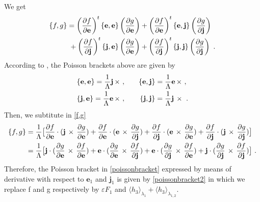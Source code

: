 \documentclass[a4paper]{article}
\begin{document}
We get
\begin{align}
\label{f,g}
\{f,g\}&=\left(\frac{\partial f}{\partial \mathbf e}\right)^{t} \{\mathbf e, \mathbf e\} \left(\frac{\partial g}{\partial \mathbf e}\right)
+\left(\frac{\partial f}{\partial \mathbf e}\right)^{t} \{\mathbf e, \mathbf j\} \left(\frac{\partial g}{\partial \mathbf j}\right)  \notag \\
& \; +\left(\frac{\partial f}{\partial \mathbf j}\right)^{t} \{\mathbf j, \mathbf e\} \left(\frac{\partial g}{\partial \mathbf e}\right)
+\left(\frac{\partial f}{\partial \mathbf j}\right)^{t} \{\mathbf j, \mathbf j\} \left(\frac{\partial g}{\partial \mathbf j}\right) \ .
\end{align}
According to \cite{Milankovitch}, the Poisson brackets above are given by 
\begin{align}
\label{milank}
\{\mathbf e, \mathbf e\}=\frac{1}{\Lambda}\mathbf j \, \times \ , \qquad & \{\mathbf e, \mathbf j\}=\frac{1}{\Lambda}\mathbf e \, \times \ , \notag \\
\{\mathbf j, \mathbf e\}=\frac{1}{\Lambda}\mathbf e \, \times \ , \qquad & \, \{\mathbf j, \mathbf j\}=\frac{1}{\Lambda}\mathbf j \, \times  \ .
\end{align}
Then, we subtitute in \eqref{f,g}
\begin{align}
\{f,g\}&=\frac{1}{\Lambda}\bigl[ \frac{\partial f}{\partial \mathbf e}  \cdot  (\mathbf j \, \times \, \frac{\partial g}{\partial \mathbf e})
+\frac{\partial f}{\partial \mathbf e}  \cdot  (\mathbf e \, \times \, \frac{\partial g}{\partial \mathbf j}) 
+\frac{\partial f}{\partial \mathbf j}  \cdot  (\mathbf e \, \times \, \frac{\partial g}{\partial \mathbf e})
+\frac{\partial f}{\partial \mathbf j}  \cdot  (\mathbf j \, \times \, \frac{\partial g}{\partial \mathbf j}) \bigl]  \notag \\
&=\frac{1}{\Lambda}\bigl[  \mathbf j \cdot (\frac{\partial g}{\partial \mathbf e} \, \times \, \frac{\partial f}{\partial \mathbf e})
+ \mathbf e \cdot (\frac{\partial g}{\partial \mathbf e} \, \times \, \frac{\partial f}{\partial \mathbf j}) 
+ \mathbf e \cdot (\frac{\partial g}{\partial \mathbf j} \, \times \, \frac{\partial f}{\partial \mathbf e})
+ \mathbf j \cdot (\frac{\partial g}{\partial \mathbf j} \, \times \, \frac{\partial f}{\partial \mathbf j}) \bigl] \ .
\label{poissonbracket2}
\end{align}
Therefore, the Poisson bracket in \eqref{poissonbracket} expressed by means of derivative with respect to $\mathbf e_{1}$ and $\mathbf j_{1}$ is given by \eqref{poissonbracket2} in which we replace f and g respectively by $\varepsilon F_{1}$ and $ \langle h_{3} \rangle _{\lambda_{1}} +  \langle h_{3} \rangle _{\lambda_{1,2}}$. \\
\end{document}
